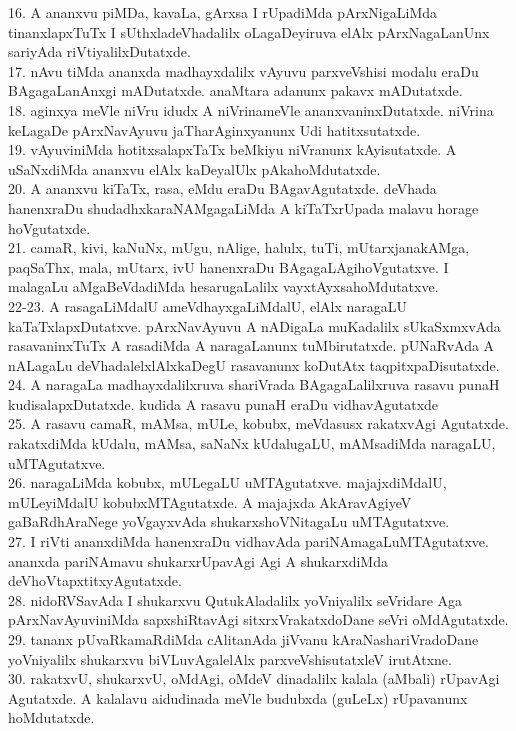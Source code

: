 \documentclass{article}
\begin{document}
16. A ananxvu piMDa, kavaLa, gArxsa I rUpadiMda pArxNigaLiMda tinanxlapxTuTx I sUthxladeVhadalilx oLagaDeyiruva elAlx pArxNagaLanUnx sariyAda riVtiyalilxDutatxde.\\
17. nAvu tiMda ananxda madhayxdalilx vAyuvu parxveVshisi modalu eraDu BAgagaLanAnxgi mADutatxde. anaMtara adanunx pakavx mADutatxde.\\
18. aginxya meVle niVru idudx A niVrinameVle ananxvaninxDutatxde. niVrina keLagaDe pArxNavAyuvu jaTharAginxyanunx Udi hatitxsutatxde.\\
19. vAyuviniMda hotitxsalapxTaTx beMkiyu niVranunx kAyisutatxde. A uSaNxdiMda ananxvu elAlx kaDeyalUlx pAkahoMdutatxde.\\
20. A ananxvu kiTaTx, rasa, eMdu eraDu BAgavAgutatxde. deVhada hanenxraDu shudadhxkaraNAMgagaLiMda A kiTaTxrUpada malavu horage hoVgutatxde.\\
21. camaR, kivi, kaNuNx, mUgu, nAlige, halulx, tuTi, mUtarxjanakAMga, paqSaThx, mala, mUtarx, ivU hanenxraDu BAgagaLAgihoVgutatxve. I malagaLu aMgaBeVdadiMda hesarugaLalilx vayxtAyxsahoMdutatxve.\\
22-23. A rasagaLiMdalU ameVdhayxgaLiMdalU, elAlx naragaLU kaTaTxlapxDutatxve. pArxNavAyuvu A nADigaLa muKadalilx sUkaSxmxvAda rasavaninxTuTx A rasadiMda A naragaLanunx tuMbirutatxde. pUNaRvAda A nALagaLu deVhadalelxlAlxkaDegU rasavanunx koDutAtx taqpitxpaDisutatxde.\\
24. A naragaLa madhayxdalilxruva shariVrada BAgagaLalilxruva rasavu punaH kudisalapxDutatxde. kudida A rasavu punaH eraDu vidhavAgutatxde\\
25. A rasavu camaR, mAMsa, mULe, kobubx, meVdasusx rakatxvAgi Agutatxde. rakatxdiMda kUdalu, mAMsa, saNaNx kUdalugaLU, mAMsadiMda naragaLU, uMTAgutatxve.\\
26. naragaLiMda kobubx, mULegaLU uMTAgutatxve. majajxdiMdalU, mULeyiMdalU kobubxMTAgutatxde. A majajxda AkAravAgiyeV gaBaRdhAraNege yoVgayxvAda shukarxshoVNitagaLu uMTAgutatxve.\\
27. I riVti ananxdiMda hanenxraDu vidhavAda pariNAmagaLuMTAgutatxve. ananxda pariNAmavu shukarxrUpavAgi Agi A shukarxdiMda deVhoVtapxtitxyAgutatxde.\\
28. nidoRVSavAda I shukarxvu QutukAladalilx yoVniyalilx seVridare Aga pArxNavAyuviniMda sapxshiRtavAgi sitxrxVrakatxdoDane seVri oMdAgutatxde.\\
29. tananx pUvaRkamaRdiMda cAlitanAda jiVvanu kAraNashariVradoDane yoVniyalilx shukarxvu biVLuvAgalelAlx parxveVshisutatxleV irutAtxne.\\
30. rakatxvU, shukarxvU, oMdAgi, oMdeV dinadalilx kalala (aMbali) rUpavAgi Agutatxde. A kalalavu aidudinada meVle budubxda (guLeLx) rUpavanunx hoMdutatxde.\\
\end{document}
